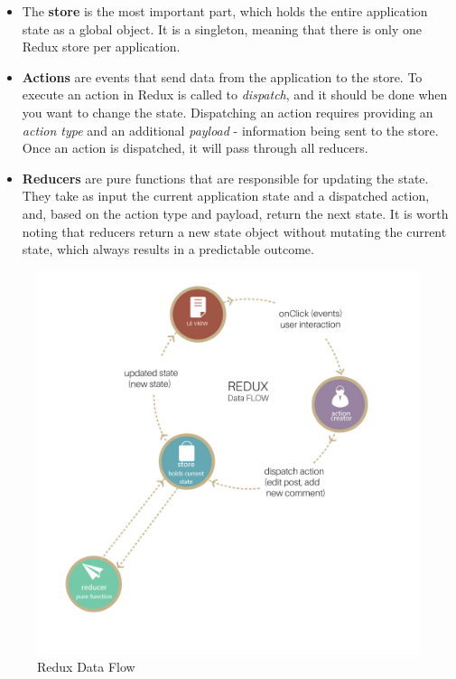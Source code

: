 \begin{itemize}
    \item The \textbf{store} is the most important part, which holds the entire application state as a global object. It is a singleton, meaning that there is only one Redux store per application.
    \item \textbf{Actions} are events that send data from the application to the store. To execute an action in Redux is called to \textit{dispatch}, and it should be done when you want to change the state. Dispatching an action requires providing an \textit{action type} and an additional \textit{payload} - information being sent to the store. Once an action is dispatched, it will pass through all reducers.
    \item \textbf{Reducers} are pure functions that are responsible for updating the state. They take as input the current application state and a dispatched action, and, based on the action type and payload, return the next state. It is worth noting that reducers return a new state object without mutating the current state, which always results in a predictable outcome.
\end{itemize}

\begin{figure}[H]
    \centering
    \includegraphics[width=5in]{images/reduxDataFlow}
    \caption{Redux Data Flow \cite{reduxFlow}}
    \label{reduxFlow}
\end{figure}




